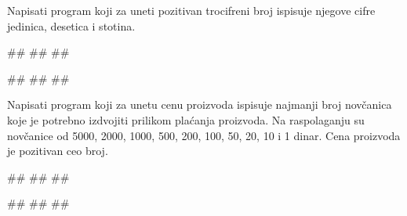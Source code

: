 

\begin{Exercise}[label=UZ_NI_10] 
Napisati program koji za uneti pozitivan trocifreni broj ispisuje njegove cifre jedinica, 
desetica i stotina. 

\begin{miditest}
\begin{upotreba}{1}
#\naslovInt#
##
##
\end{upotreba}
\end{miditest}
\begin{miditest}
\begin{upotreba}{2}
#\naslovInt#
##
##
\end{upotreba}
\end{miditest}
\end{Exercise}
\ifresenja
\begin{Answer}[ref=UZ_NI_10]
\end{Answer}
\fi


\begin{Exercise}[label=UZ_NI_11] 
Napisati program koji za unetu cenu proizvoda ispisuje najmanji broj novčanica koje je potrebno izdvojiti
prilikom plaćanja proizvoda. Na raspolaganju su novčanice od 5000, 2000, 1000, 500, 200, 100, 50, 20, 10 i 1 dinar. 
Cena proizvoda je pozitivan ceo broj. 

\begin{maxitest}
\begin{upotreba}{1}
#\naslovInt#
##
##
\end{upotreba}
\begin{upotreba}{2}
#\naslovInt#
##
##
\end{upotreba}
\end{maxitest}
\end{Exercise}
\ifresenja
\begin{Answer}[ref=UZ_NI_11]
\end{Answer}
\fi

